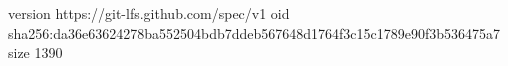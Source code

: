 version https://git-lfs.github.com/spec/v1
oid sha256:da36e63624278ba552504bdb7ddeb567648d1764f3c15c1789e90f3b536475a7
size 1390
